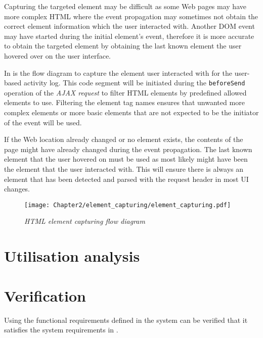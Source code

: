 Capturing the targeted element may be difficult as some Web pages may have more complex HTML where the event propagation may sometimes not obtain the correct element information which the user interacted with. Another DOM event may have started during the initial element's event, therefore it is more accurate to obtain the targeted element by obtaining the last known element the user hovered over on the user interface.\par In  is the flow diagram to capture the element user interacted with for the user-based activity log. This code segment will be initiated during the \texttt{beforeSend} operation of the \textit{AJAX request} to filter HTML elements by predefined allowed elements to use. Filtering the element tag names ensures that unwanted more complex elements or more basic elements that are not expected to be the initiator of the event will be used. \par If the Web location already changed or no element exists, the contents of the page might have already changed during the event propagation. The last known element that the user hovered on must be used as most likely might have been the element that the user interacted with. This will ensure there is always an element that has been detected and parsed with the request header in most UI changes.

\clearpage

\begin{figure}[!htb] %
	\centering %
	\texttt{[image: Chapter2/element\_capturing/element\_capturing.pdf]}
	\caption[HTML element capturing flow diagram]
	{\textit{HTML element capturing flow diagram}}\label{fig:ch2_element_event_capturing}
\end{figure}

\section{Utilisation analysis}


\section{Verification}\label{sec:ch3_verification}
Using the functional requirements defined in  the system can be verified that it satisfies the system requirements in .

